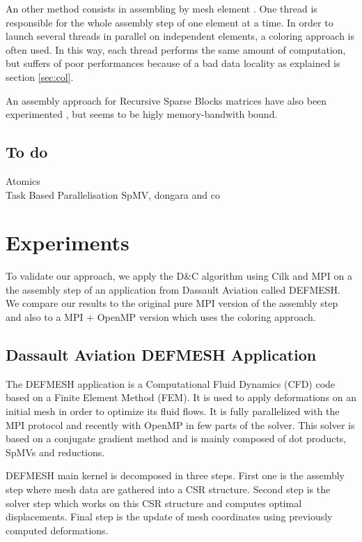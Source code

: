 \documentclass{IOS-Book-Article}
\begin{document}
An other method consists in assembling by mesh element \cite{CUDAfe,CPUfe1,CPUfe2}. One thread is responsible for the whole assembly step of one element at a time.
In order to launch several threads in parallel on independent elements, a coloring approach is often used.
In this way, each thread performs the same amount of computation, but suffers of poor performances because of a bad data locality as explained is section \ref{sec:col}.

An assembly approach for Recursive Sparse Blocks matrices have also been experimented \cite{RSBasm}, but seems to be higly memory-bandwith bound.

\subsection{To do}
Atomics\\
Task Based Parallelisation SpMV, dongara and co \cite{MPI_task}\\

\section{Experiments}
To validate our approach, we apply the D\&C algorithm using Cilk and MPI on a the assembly step of an application from Dassault Aviation called DEFMESH.
We compare our results to the original pure MPI version of the assembly step and also to a MPI + OpenMP version which uses the coloring approach.

\subsection{Dassault Aviation DEFMESH Application}
The DEFMESH application is a Computational Fluid Dynamics (CFD) code based on a Finite Element Method (FEM).
It is used to apply deformations on an initial mesh in order to optimize its fluid flows.
It is fully parallelized with the MPI protocol and recently with OpenMP in few parts of the solver.
This solver is based on a conjugate gradient method and is mainly composed of dot products, SpMVs and reductions.

DEFMESH main kernel is decomposed in three steps.
First one is the assembly step where mesh data are gathered into a CSR structure.
Second step is the solver step which works on this CSR structure and computes optimal displacements.
Final step is the update of mesh coordinates using previously computed deformations.
\end{document}
